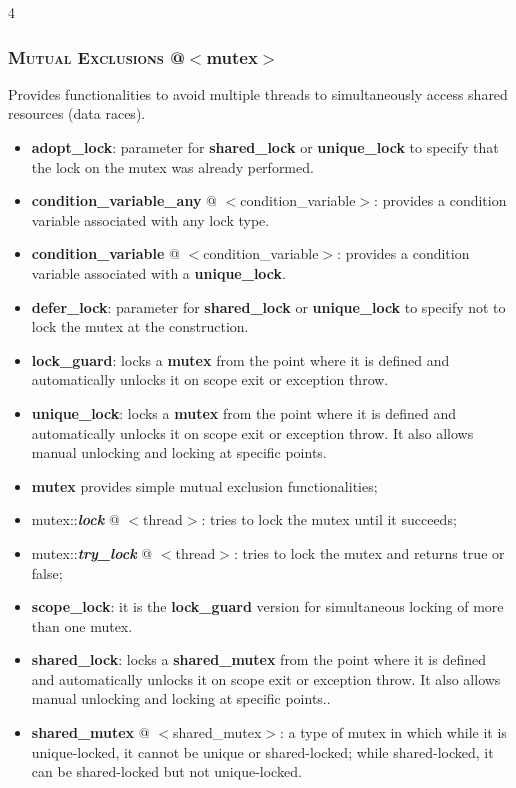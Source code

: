 \documentclass[10pt]{article}
\begin{document}
\begin{multicols*}{4}
{\subsubsection*{\textsc{Mutual Exclusions} @$<$mutex$>$}
\noindent
Provides functionalities to avoid multiple threads to simultaneously access shared resources (data races).
\begin{itemize}[leftmargin=*,topsep=0.25pt]
  \setlength\itemsep{-1.8pt}
\item  {\textbf{adopt\_lock}}: parameter for {\textbf{shared\_lock}} or {\textbf{unique\_lock}} to specify that the lock on the mutex was already performed.
	\item  {{\textbf{condition\_variable\_any}}} @ $<$condition\_variable$>$: provides a condition variable associated with any lock type.
	\item  {{\textbf{condition\_variable}}} @ $<$condition\_variable$>$: provides a condition variable associated with a {\textbf{unique\_lock}}.
\item  {\textbf{defer\_lock}}: parameter for {\textbf{shared\_lock}} or {\textbf{unique\_lock}} to specify not to lock the mutex at the construction.
	\item  \textbf{lock\_guard}: locks a \textbf{mutex} from the point where it is defined and automatically unlocks it on scope exit or exception throw.
	\item  {{\textbf{unique\_lock}}}: locks a \textbf{mutex} from the point where it is defined and automatically unlocks it on scope exit or exception throw. It also allows manual unlocking and locking at specific points.
	\item  {\textbf{mutex}} provides simple mutual exclusion functionalities;
	 \item  mutex::\emph{\textbf{lock}} @ $<$thread$>$: tries to lock the mutex until it succeeds;
	 \item  mutex::\emph{\textbf{try\_lock}} @ $<$thread$>$: tries to lock the mutex and returns true or false;
\item  {\textbf{scope\_lock}}: it is the \textbf{lock\_guard} version for simultaneous locking of more than one mutex.
	\item  {\textbf{shared\_lock}}: locks a \textbf{shared\_mutex} from the point where it is defined and automatically unlocks it on scope exit or exception throw. It also allows manual unlocking and locking at specific points..
	\item  \textbf{shared\_mutex} @ $<$shared\_mutex$>$: a type of mutex in which while it is unique-locked, it cannot be unique or shared-locked; while shared-locked, it can be shared-locked but not unique-locked.
\end{itemize}

}
\end{multicols*}
\end{document}
